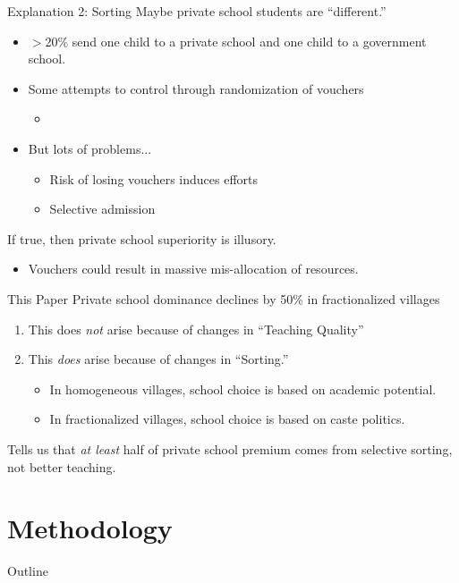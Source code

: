 \documentclass{beamer}
\begin{document}
\begin{frame}{Explanation 2: Sorting}
Maybe private school students are ``different.''
\pause
	\begin{itemize}
			\item $>$20\%  send one child to a private school and one child to a government school.
			\pause
		\item Some attempts to control through randomization of vouchers
			\begin{itemize}
				\item \cite{Angrist:2002up, Bellei:2008uu}
			\end{itemize}
		\pause
		\item But lots of problems...
			\begin{itemize}
				\item Risk of losing vouchers induces efforts
				\item Selective admission
			\end{itemize}
	\end{itemize}	

\pause
If true, then private school superiority is illusory. 
\begin{itemize}
	\item Vouchers could result in massive mis-allocation of resources.
\end{itemize}
\end{frame}


\begin{frame}{This Paper}
\pause	
Private school dominance declines by 50\% in fractionalized villages
	\pause
\begin{enumerate}
	\item This does \emph{not} arise because of changes in ``Teaching Quality''
	\pause
	\item This \emph{does} arise because of changes in ``Sorting.''
	\pause
		\begin{itemize}
			\item In homogeneous villages, school choice is based on academic potential.
			\pause
			\item In fractionalized villages, school choice is based on caste politics.
		\end{itemize}
\end{enumerate}
\pause
Tells us that \emph{at least} half of private school premium comes from selective sorting, not better teaching.
\end{frame}



\section{Methodology}\label{}
\begin{frame}{Outline}
	\tableofcontents[currentsection]
\end{frame}
\end{document}
